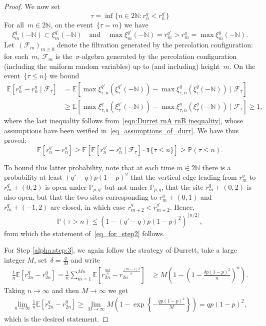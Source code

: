 \documentclass[pdflatex,sn-mathphys-num]{sn-jnl}%
\newcommand{\bbE}{{\ensuremath{\mathbb E}} }
\newcommand{\bbN}{{\ensuremath{\mathbb N}} }
\newcommand{\bbP}{{\ensuremath{\mathbb P}} }
\newcommand{\1}{{\ensuremath{\mathbf{1}}} }
\theoremstyle{thmstyleone}%
\theoremstyle{thmstyletwo}%
\theoremstyle{thmstylethree}%
\begin{document}
\begin{proof}
We now set
\[
	\tau = \inf\{ n\in 2\mathbb N: r^{q}_{n} < r_{n}^{q'}\}
\]
	 For all~$m \in 2 \mathbb N$, on the event~$\{ \tau = m\}$ we have
	\begin{equation}
	\label{eq_assumptions_of_durr}
	\xi_m^q(-\bbN) \subset \xi_m^{q'}(-\bbN)  \quad \text{and}\quad \max \xi_m^{q'}(-\bbN) = r_m^{q'} > r_m^q = \max \xi_m^q(-\bbN).
	\end{equation}
	Let~$(\mathcal F_m)_{m \ge 0}$ denote the filtration generated by the percolation configuration: for each~$m$, $\mathcal F_m$ is the~$\sigma$-algebra generated by the percolation configuration (including the uniform random variables) up to (and including) height~$m$. On the event~$\{\tau \le n\}$ we bound
	\begin{align*}
		\bbE [r^{q'}_n - r^q_n \mid \mathcal F_\tau ] &= \bbE[\max \xi_{\tau,n}^{q'}(\xi_\tau^{q'}(-\bbN)) - \max \xi_{\tau,n}^{q}(\xi_\tau^{q}(-\bbN)) \mid \mathcal F_\tau]\\
		&\ge \bbE[\max \xi_{\tau, n}^{q}(\xi_\tau^{q'}(-\bbN)) - \max \xi_{\tau, n}^{q}(\xi_\tau^{q}(-\bbN)) \mid \mathcal F_\tau] \ge 1,
	\end{align*}
	where the last inequality follows from~\eqref{eqn:Durret rnA rnB inequality}, whose assumptions have been verified in~\eqref{eq_assumptions_of_durr}. We have thus proved:
	\[
		\bbE[r_n^{q'} - r_n^q] \ge\bbE[ \bbE[r_n^{q'} - r_n^q \mid \mathcal{F}_\tau] \cdot  \1\{\tau \le n\}] \ge \bbP(\tau \le n).
	\]

	To bound this latter probability, note that at each time $m \in 2\mathbb N$ there is a probability at least $(q'-q)p(1-p)^2$ that the vertical edge leading from $r^{q}_{m}$ to $r^{q}_{m} + (0,2)$ is open under $\bbP_{p,q'}$ but not under $\bbP_{p,q}$, that the site $r^{q}_{m} + (0,2)$ is also open, but that the two sites corresponding to $r^{q}_{m} + (0,1)$ and $r^{q}_{m} + (-1,2)$ are closed, in which case $r^{q}_{m+2} < r^{q'}_{m+2}$. Hence, 
	\begin{equation}
		\label{eq_bound_tau}
		\bbP ( \tau > n) \leq (1-(q'-q)p(1-p)^2)^{\lfloor n/2\rfloor}, 
	\end{equation}
	from which the statement of~\eqref{eq_for_step2}  follows.

For Step \ref{alpha:step:3}, we again follow the strategy of Durrett, take a large integer $M$, set~$\delta = \frac{q}{M}$ and write 
\begin{align*}
\frac{1}{n}\bbE \left[r_{2n}^q - r^0_{2n}\right] = \frac{1}{n}\sum_{m=1}^{Mn} \bbE \left[r_{2n}^{\frac{m\delta}{n}} - r_{2n}^{\frac{(m-1)\delta}{n}}\right] &\geq M\left(1-\left(1-\frac{\delta p(1-p)^2}{n}\right)^n \right).
\end{align*}
Taking $n \to \infty$ and then $M \to \infty$ we get 
\begin{align*}
 \lim_{n \to \infty} \frac{1}{n}\bbE \left[r_{2n}^q - r^0_{2n}\right] \geq \lim_{M \to \infty} M \left(1-\exp \left\{-\frac{q p(1-p)^2}{M}\right\}\right) = qp(1-p)^2,  
\end{align*}
which is the desired statement.


\end{proof}
\end{document}
